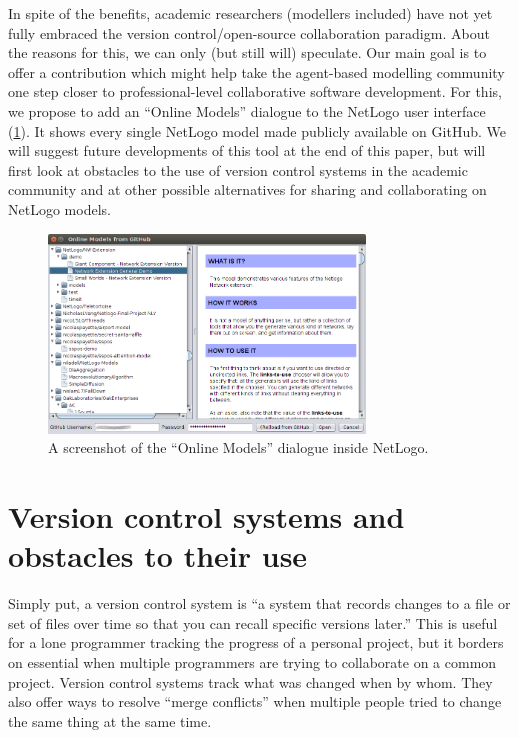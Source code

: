 \documentclass[runningheads]{llncs}
\begin{document}
In spite of the benefits, academic researchers (modellers included) have not yet fully embraced the version control/open-source collaboration paradigm. About the reasons for this, we can only (but still will) speculate. Our main goal is to offer a contribution which might help take the agent-based modelling community one step closer to professional-level collaborative software development. For this, we propose to add an ``Online Models'' dialogue to the NetLogo user interface (\cref{fig:screenshot}). It shows every single NetLogo model made publicly available on GitHub. We will suggest future developments of this tool at the end of this paper, but will first look at obstacles to the use of version control systems in the academic community and at other possible alternatives for sharing and collaborating on NetLogo models.

\setlength{\belowcaptionskip}{-20pt}
\begin{figure}
  \centering
  \includegraphics[width=0.75\textwidth]{screenshot.png}
  \caption{A screenshot of the ``Online Models'' dialogue inside NetLogo.}
  \label{fig:screenshot}
\end{figure}

\section{Version control systems and obstacles to their use}

Simply put, a version control system is ``a system that records changes to a file or set of files over time so that you can recall specific versions later.'' \cite{chacon_pro_2014} This is useful for a lone programmer tracking the progress of a personal project, but it borders on essential when multiple programmers are trying to collaborate on a common project. Version control systems track what was changed when by whom. They also offer ways to resolve ``merge conflicts'' when multiple people tried to change the same thing at the same time.
\end{document}
